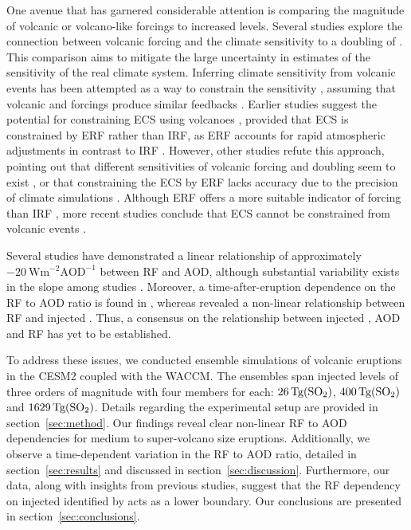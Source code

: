 \documentclass[draft]{agujournal2019}
\newcommand{\iso}[1][i]{{#1}njected \ce{SO2}}
\begin{document}
One avenue that has garnered considerable attention is comparing the magnitude of
volcanic or volcano-like forcings to increased  levels. Several studies explore
the connection between volcanic forcing and the climate sensitivity to a doubling of
\cite{boer2007,marvel2016,merlis2014,ollila2016,richardson2019,salvi2022,wigley2005}.
This comparison aims to mitigate the large uncertainty in estimates of the sensitivity
of the real climate system. Inferring climate sensitivity from volcanic events has been
attempted as a way to constrain the sensitivity \cite{boer2007}, assuming that volcanic
and  forcings produce similar feedbacks \cite{pauling2023}. Earlier studies
suggest the potential for constraining ECS using volcanoes \cite{bender2010},
provided that ECS is constrained by ERF rather than IRF, as ERF
accounts for rapid atmospheric adjustments in contrast to IRF
\cite{richardson2019}. However, other studies refute this approach, pointing out that
different sensitivities of volcanic forcing and  doubling seem to exist
\cite{douglass2006}, or that constraining the ECS by ERF lacks accuracy due
to the precision of climate simulations \cite{boer2007,salvi2022}. Although ERF
offers a more suitable indicator of forcing than IRF
\cite{marvel2016,richardson2019}, more recent studies conclude that ECS cannot be
constrained from volcanic events \cite{pauling2023}.

Several studies have demonstrated a linear relationship of approximately
\(-\SI{20}{\watt\metre^{-2}\mathrm{AOD}^{-1}}\) between RF and AOD, although
substantial variability exists in the slope among studies
\cite{mills2017,hansen2005,gregory2016,marshall2020,pitari2016b}. Moreover, a
time-after-eruption dependence on the RF to AOD ratio is found in
, whereas  revealed a non-linear relationship
between RF and \iso{}. Thus, a consensus on the relationship between \iso{},
AOD and RF has yet to be established.

To address these issues, we conducted ensemble simulations of volcanic eruptions in the
CESM2 coupled with the WACCM. The ensembles span \iso{} levels of three
orders of magnitude with four members for each: \(\SI{26}{\tera\gram(\ce{SO2})}\),
\(\SI{400}{\tera\gram(\ce{SO2})}\) and \(\SI{1629}{\tera\gram(\ce{SO2})}\). Details
regarding the experimental setup are provided in section~\ref{sec:method}. Our findings
reveal clear non-linear RF to AOD dependencies for medium to super-volcano
size eruptions. Additionally, we observe a time-dependent variation in the RF to
AOD ratio, detailed in section~\ref{sec:results} and discussed in
section~\ref{sec:discussion}. Furthermore, our data, along with insights from previous
studies, suggest that the RF dependency on \iso{} identified by
 acts as a lower boundary. Our conclusions are presented in
section~\ref{sec:conclusions}.
\end{document}
